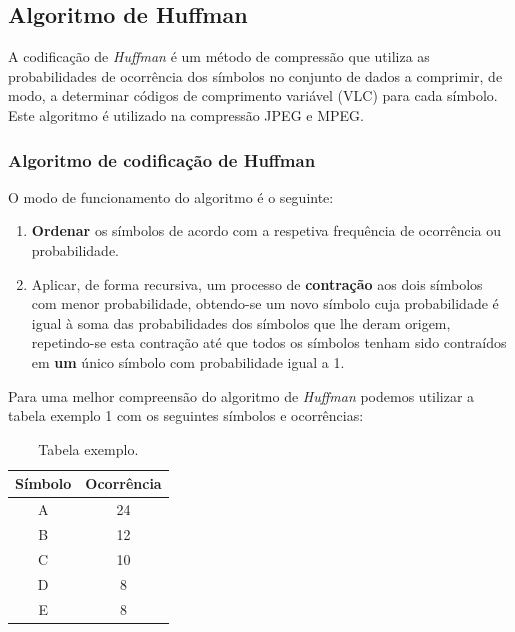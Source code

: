 \documentclass[12pt,a4paper]{article}
\begin{document}
\subsection{Algoritmo de Huffman}
A codificação de \textit{Huffman} é um método de compressão que utiliza as probabilidades de ocorrência dos símbolos no conjunto de dados a comprimir, de modo, a determinar códigos de comprimento variável (VLC) para cada símbolo. Este algoritmo é utilizado na compressão JPEG e MPEG.
\subsubsection{Algoritmo de codificação de Huffman}
O modo de funcionamento do algoritmo é o seguinte:
\begin{enumerate}
\item \textbf{Ordenar} os símbolos de acordo com a respetiva frequência de ocorrência ou probabilidade.
\item Aplicar, de forma recursiva, um processo de \textbf{contração} aos dois símbolos com menor probabilidade, obtendo-se um novo símbolo cuja probabilidade é igual à soma das probabilidades dos símbolos que lhe deram origem, repetindo-se esta contração até que todos os símbolos tenham sido contraídos em \textbf{um} único símbolo com probabilidade igual a 1.
\end{enumerate}
Para uma melhor compreensão do algoritmo de \textit{Huffman} podemos utilizar a tabela exemplo 1 com os seguintes símbolos e ocorrências:
\newline
\begin{table}[h]
\centering
\label{my-label}
\begin{tabular}{|c|c|}
\hline
Símbolo & Ocorrência \\ \hline
A       & 24         \\ \hline
B       & 12         \\ \hline
C       & 10         \\ \hline
D       & 8          \\ \hline
E       & 8          \\ \hline
\end{tabular}
\caption{Tabela exemplo.}
\end{table}
\end{document}
